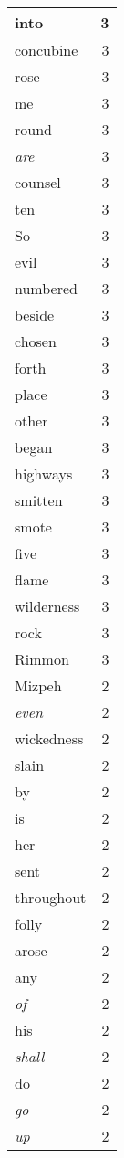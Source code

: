 \begin{center}
\begin{longtable}{l|r}
into & 3 \\ \hline
concubine & 3 \\ \hline
rose & 3 \\ \hline
me & 3 \\ \hline
round & 3 \\ \hline
\emph{are} & 3 \\ \hline
counsel & 3 \\ \hline
ten & 3 \\ \hline
So & 3 \\ \hline
evil & 3 \\ \hline
numbered & 3 \\ \hline
beside & 3 \\ \hline
chosen & 3 \\ \hline
forth & 3 \\ \hline
place & 3 \\ \hline
other & 3 \\ \hline
began & 3 \\ \hline
highways & 3 \\ \hline
smitten & 3 \\ \hline
smote & 3 \\ \hline
five & 3 \\ \hline
flame & 3 \\ \hline
wilderness & 3 \\ \hline
rock & 3 \\ \hline
Rimmon & 3 \\ \hline
Mizpeh & 2 \\ \hline
\emph{even} & 2 \\ \hline
wickedness & 2 \\ \hline
slain & 2 \\ \hline
by & 2 \\ \hline
is & 2 \\ \hline
her & 2 \\ \hline
sent & 2 \\ \hline
throughout & 2 \\ \hline
folly & 2 \\ \hline
arose & 2 \\ \hline
any & 2 \\ \hline
\emph{of} & 2 \\ \hline
his & 2 \\ \hline
\emph{shall} & 2 \\ \hline
do & 2 \\ \hline
\emph{go} & 2 \\ \hline
\emph{up} & 2 \\ \hline

\end{longtable}
\end{center}
